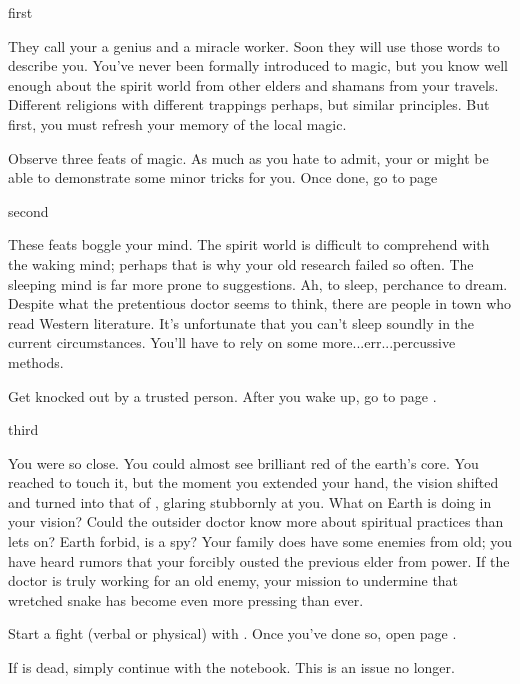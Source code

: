 \documentclass[greennotebook]{Pestilence} %
\begin{document}
\startnotebook{\nApprenticeLab{}}

\begin{page}{first}

They call your \cElder{\parent} a genius and a miracle worker. Soon they will use those words to describe you. You've never been formally introduced to magic, but you know well enough about the spirit world from other elders and shamans from your travels. Different religions with different trappings perhaps, but similar principles. But first, you must refresh your memory of the local magic.

Observe three feats of magic. As much as you hate to admit, your \cElder{\parent} or \cRebel{\sibling} might be able to demonstrate some minor tricks for you. Once done, go to page 

\end{page}

\begin{page}{second}

These feats boggle your mind. The spirit world is difficult to comprehend with the waking mind; perhaps that is why your old research failed so often. The sleeping mind is far more prone to suggestions. Ah, to sleep, perchance to dream. Despite what the pretentious doctor seems to think, there are people in town who read Western literature. It's unfortunate that you can't sleep soundly in the current circumstances. You'll have to rely on some more...err...percussive methods.

Get knocked out by a trusted person. After you wake up, go to page .

\end{page}

\begin{page}{third}

You were so close. You could almost see brilliant red of the earth's core. You reached to touch it, but the moment you extended your hand, the vision shifted and turned into that of \cOutsider{}, glaring stubbornly at you. What on Earth is \cOutsider{\they} doing in your vision? Could the outsider doctor know more about spiritual practices than \cOutsider{\they} lets on? Earth forbid, is \cOutsider{\they} a spy? Your family does have some enemies from old; you have heard rumors that your \cElder{\parent} forcibly ousted the previous elder from power. If the doctor is truly working for an old enemy, your mission to undermine that wretched snake has become even more pressing than ever.

Start a fight (verbal or physical) with \cOutsider{}. Once you've done so, open page . 

If \cOutsider{} is dead, simply continue with the notebook. This is an issue no longer.

\end{page}
\end{document}

